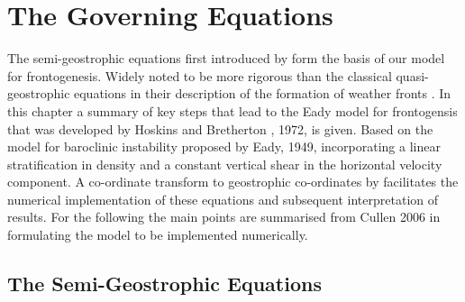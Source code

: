 \chapter{The Governing Equations}
The semi-geostrophic equations first introduced by \cite{Eliassen1962}
form the basis of our model for frontogenesis. Widely noted to be more rigorous than the classical quasi-geostrophic equations in their description of the formation of weather fronts 
\cite{Cullen2006a, Hoskins1975}. 
In this chapter a summary of key steps that lead to the Eady model for frontogensis that was developed by Hoskins and Bretherton , 1972, \cite{Hoskins1972} is given. Based on the model for baroclinic instability proposed by Eady, 1949, incorporating a linear stratification in density and a constant vertical shear in the horizontal velocity component. A co-ordinate transform to geostrophic co-ordinates by  \cite{Hoskins1975} 
facilitates the numerical implementation of these equations and subsequent interpretation of results. For the following the main points are summarised from Cullen 2006 \cite{Cullen2006a} in formulating the model to be implemented numerically.
\section{The Semi-Geostrophic Equations \label{SGeqns}} 
